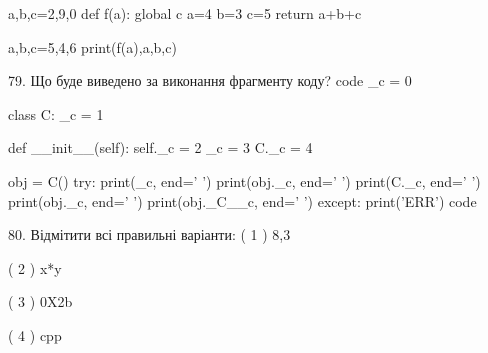 \documentclass[11pt]{article}
\begin{document}
a,b,c=2,9,0
def f(a):
global c    a=4
    b=3
    c=5
    return a+b+c

a,b,c=5,4,6
print(f(a),a,b,c)

79. Що буде виведено за виконання фрагменту коду?
code
_c = 0

class C:
    _c = 1
    
    def __init__(self):
        self._c = 2
        _c = 3
        C._c = 4

obj = C()
try:
    print(_c, end=' ')
    print(obj._c, end=' ')
    print(C._c, end=' ')
    print(obj._c, end=' ')
    print(obj._C__c, end=' ')
except:
    print('ERR')
code

80. Відмітити всі правильні варіанти:
( 1 ) 8,3

( 2 ) x*y

( 3 ) 0X2b

( 4 ) cpp

















































































\newpage
\end{document}
